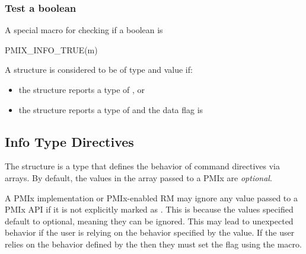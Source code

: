 \subsubsection{Test a boolean }

A special macro for checking if a boolean  is 

\cspecificstart
\begin{codepar}
PMIX_INFO_TRUE(m)
\end{codepar}
\cspecificend

\begin{arglist}
\end{arglist}

A  structure is considered to be of type  and value  if:

\begin{itemize}
    \item the structure reports a type of , or
    \item the structure reports a type of  and the data flag is 
\end{itemize}

\subsection{Info Type Directives}

The  structure is a  type that defines the behavior of command directives via  arrays.
By default, the values in the  array passed to a PMIx are \emph{optional}.

\adviceuserstart
A PMIx implementation or PMIx-enabled \ac{RM} may ignore any  value passed to a \ac{PMIx} \ac{API} if it is not explicitly marked as .
This is because the values specified default to optional, meaning they can be ignored.
This may lead to unexpected behavior if the user is relying on the behavior specified by the  value.
If the user relies on the behavior defined by the  then they must set the  flag using the  macro.
\adviceuserend

